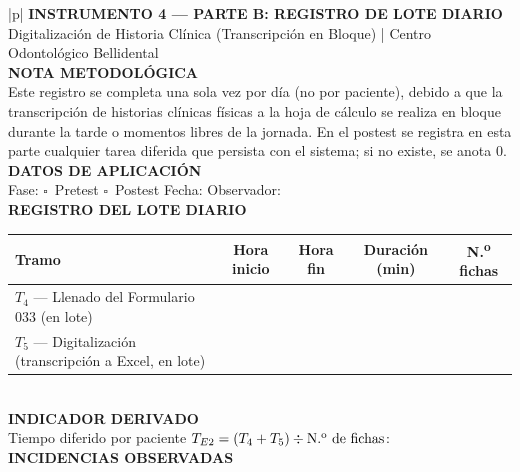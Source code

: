 \vspace{0.8cm}


\medskip\small
\begin{longtable}{|p{\fichawidth}|}
\hline
{}\textbf{INSTRUMENTO 4 — PARTE B: REGISTRO DE LOTE DIARIO} \\[-2pt]
Digitalización de Historia Clínica (Transcripción en Bloque) | Centro Odontológico Bellidental \\
\hline
{}\textbf{NOTA METODOLÓGICA} \\
\hline
Este registro se completa una sola vez por día (no por paciente), debido a que la transcripción de historias clínicas físicas a la hoja de cálculo se realiza en bloque durante la tarde o momentos libres de la jornada. En el postest se registra en esta parte cualquier tarea diferida que persista con el sistema; si no existe, se anota 0. \\
\hline
{}\textbf{DATOS DE APLICACIÓN} \\
\hline
Fase: $\square$~Pretest \quad $\square$~Postest \qquad
Fecha: \underline{\hspace{3cm}} \quad
Observador: \underline{\hspace{4cm}} \\
\hline
{}\textbf{REGISTRO DEL LOTE DIARIO} \\
\hline
\begin{tabularx}{\linewidth}{|>{\raggedright\arraybackslash}X|c|c|c|c|}
\hline
\textbf{Tramo} & \textbf{Hora inicio} & \textbf{Hora fin} & \textbf{Duración (min)} & \textbf{N.\textsuperscript{o} fichas} \\ \hline
$T_4$ — Llenado del Formulario 033 (en lote) & & & & \\[12pt] \hline
$T_5$ — Digitalización (transcripción a Excel, en lote) & & & & \\[12pt] \hline
\end{tabularx} \\
\hline
{}\textbf{INDICADOR DERIVADO} \\
\hline
Tiempo diferido por paciente $T_{E2} = (T_4 + T_5) \div \text{N.\textsuperscript{o} de fichas}$: \underline{\hspace{3cm}} \\
\hline
{}\textbf{INCIDENCIAS OBSERVADAS} \\
\hline
\underline{\hspace{\linewidth}} \\[4pt]
\underline{\hspace{\linewidth}} \\
\hline
\end{longtable}

